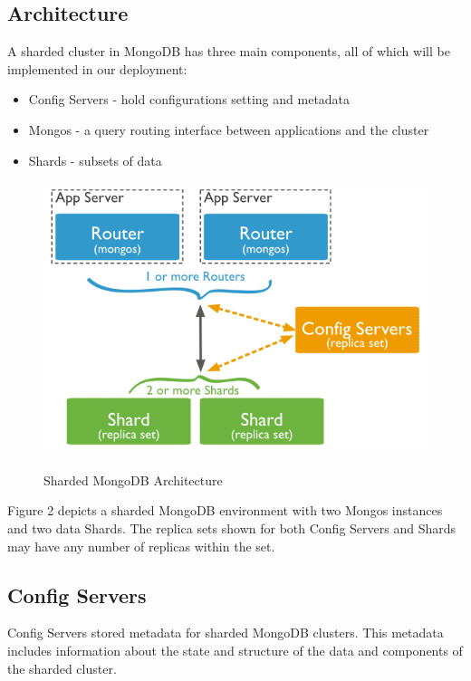 \documentclass[9pt,twocolumn,twoside]{styles/osajnl}
\begin{document}
\subsection{Architecture}

A sharded cluster in MongoDB has three main components, all of which will be implemented in our deployment:

\vspace{-\topsep}
\begin{itemize}
\item Config Servers - hold configurations setting and metadata
\item Mongos - a query routing interface between applications and the cluster
\item Shards - subsets of data
\end{itemize}
\vspace{-\topsep}

\begin{figure}[ht]
  \includegraphics[scale=0.5]{images/sharded-cluster-production-architecture.png}
  \caption{Sharded MongoDB Architecture} \cite{www-mongoComponents}
\end{figure}

Figure 2 depicts a sharded MongoDB environment with two Mongos instances and two data Shards.  The replica sets shown for both Config Servers and Shards may have any number of replicas within the set.

\subsection{Config Servers}

Config Servers stored metadata for sharded MongoDB clusters.  This metadata includes information about the state and structure of the data and components of the sharded cluster. \cite{www-mongoConfig}
\end{document}
